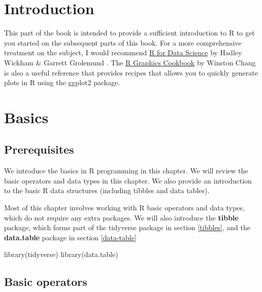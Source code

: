\documentclass[
]{book}
\newenvironment{Shaded}{\begin{snugshade}}{\end{snugshade}}
\newcommand{\FunctionTok}[1]{\textcolor[rgb]{0.00,0.00,0.00}{#1}}
\newcommand{\NormalTok}[1]{#1}
\begin{document}
\hypertarget{r-basics}{%
\chapter{Introduction}\label{r-basics}}

This part of the book is intended to provide a sufficient introduction to R to get you started on the subsequent parts of this book. For a more comprehensive treatment on the subject, I would recommend \href{https://r4ds.had.co.nz/index.html}{R for Data Science} by Hadley Wickham \& Garrett Grolemund \citep{wickham_r_2016}. The \href{https://r-graphics.org}{R Graphics Cookbook} by Winston Chang \citep{chang_r_2018} is also a useful reference that provides recipes that allows you to quickly generate plots in R using the ggplot2 package.

\hypertarget{basics}{%
\chapter{Basics}\label{basics}}

\hypertarget{prerequisites-1}{%
\section{Prerequisites}\label{prerequisites-1}}

We introduce the basics in R programming in this chapter. We will review the basic operators and data types in this chapter. We also provide an introduction to the basic R data structures (including tibbles and data tables).

Most of this chapter involves working with R basic operators and data types, which do not require any extra packages. We will also introduce the \textbf{tibble} package, which forms part of the tidyverse package in section \ref{tibbles}, and the \textbf{data.table} package in section \ref{data-table}

\begin{Shaded}
\begin{Highlighting}[]
\FunctionTok{library}\NormalTok{(tidyverse)}
\FunctionTok{library}\NormalTok{(data.table)}
\end{Highlighting}
\end{Shaded}

\hypertarget{basic-operators}{%
\section{Basic operators}\label{basic-operators}}
\end{document}
